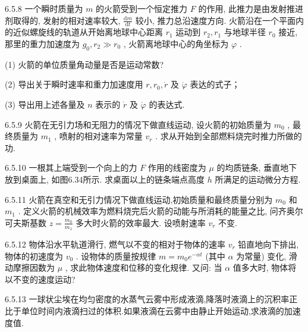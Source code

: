 \begin{problem}{6.5.8}
一个瞬时质量为 $m$ 的火箭受到一个恒定推力 $F$ 的作用, 此推力是由发射推进剂取得的, 发射的相对速率较大, $\frac{\mathrm{d}m}{\mathrm{d}t}$ 较小, 推力总沿速度方向. 火箭沿在一个平面内的近似螺旋线的轨道从开始离地球中心距离 $r_1$ 运动到 $r_2, r_1$ 与地球半径 $r_0$ 接近, 那里的重力加速度为 $g_0, r_2 \gg r_0$ , 火箭离地球中心的角坐标为 $\varphi$ .

(1) 火箭的单位质量角动量是否是运动常数?

(2) 导出关于瞬时速率和重力加速度用 $r, r_{0}, \dot{r}$ 及 $\dot{\varphi}$ 表达的式子；

(3) 导出用上述各量及 $n$ 表示的 $\dot{r}$ 及 $\ddot{\varphi}$ 的表达式.
\end{problem}
\clearpage


\begin{problem}{6.5.9}
火箭在无引力场和无阻力的情况下做直线运动, 设火箭的初始质量为 $m_{0}$ , 最终质量为 $m_{1}$ , 喷射的相对速率为常量 $v_{r}$ . 求从开始到全部燃料烧完时推力所做的功.
\end{problem}
\clearpage


\begin{problem}{6.5.10}
一根其上端受到一个向上的力 $F$ 作用的线密度为 $\mu$ 的均质链条, 垂直地下放到桌面上, 如图6.34所示. 求桌面以上的链条端点高度 $h$ 所满足的运动微分方程.
\begin{center}

\end{center}
\end{problem}
\clearpage


\begin{problem}{6.5.11}
火箭在真空和无引力情况下做直线运动,初始质量和最终质量分别为 $m_{0}$ 和 $m_{1}$ . 定义火箭的机械效率为燃料烧完后火箭的动能与所消耗的能量之比, 问齐奥尔可夫斯基数 $z = \frac{m_0}{m_1}$ 多大时火箭的效率最大. 设喷射速率 $v_{r}$ 不变.
\end{problem}
\clearpage


\begin{problem}{6.5.12}
物体沿水平轨道滑行, 燃气以不变的相对于物体的速率 $v_{r}$ 铅直地向下排出, 物体的初速度为 $v_{0}$ . 设物体的质量按规律 $m = m_{0} e^{-\alpha t}$ (其中 $\alpha$ 为常量) 变化, 滑动摩擦因数为 $\mu$ , 求此物体速度和位移的变化规律. 又问: 当 $\alpha$ 值多大时, 物体将以不变的速度运动?
\end{problem}
\clearpage


\begin{problem}{6.5.13}
一球状尘埃在均匀密度的水蒸气云雾中形成液滴,降落时液滴上的沉积率正比于单位时间内液滴扫过的体积.如果液滴在云雾中由静止开始运动,求液滴的加速度值.
\end{problem}
\clearpage


